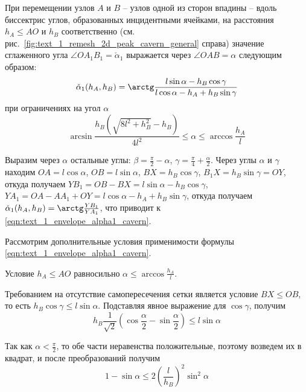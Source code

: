 \documentclass[
11pt,%
tightenlines,%
twoside,%
onecolumn,%
nofloats,%
nobibnotes,%
nofootinbib,%
superscriptaddress,%
noshowpacs,%
centertags]%
{revtex4}
\begin{document}
\begin{lemma}\label{lem:text_1_cavern_smooth}
При перемещении узлов $A$ и $B$ -- узлов одной из сторон впадины -- вдоль биссектрис углов, образованных инцидентными ячейками, на расстояния $h_A \le AO$ и $h_B$ соответственно (см. рис.~\ref{fig:text_1_remesh_2d_peak_cavern_general} справа) значение сглаженного угла $\angle OA_1B_1 = \check{\alpha}_1$ выражается через $\angle OAB = \alpha$ следующим образом:
\begin{equation}\label{eqn:text_1_envelope_alpha1_cavern}
\check{\alpha}_1(h_A, h_B) = \arctg \frac{l \sin \alpha - h_B \cos \gamma}{l \cos \alpha - h_A + h_B \sin \gamma}
\end{equation}
при ограничениях на угол $\alpha$
\begin{equation}\label{eqn:text_1_envelope_alpha1_cavern2}
\arcsin \frac{h_B \left( \sqrt{8 l^2 + h_B^2} - h_B \right)}{4 l^2} \le \alpha \le \arccos \frac{h_A}{l}
\end{equation}
\end{lemma}

Выразим через $\alpha$ остальные углы: $\beta = \frac{\pi}{2} - \alpha$, $\gamma = \frac{\pi}{4} + \frac{\alpha}{2}$.
Через углы $\alpha$ и $\gamma$ находим $OA = l \cos \alpha$, $OB = l \sin \alpha$, $BX = h_B \cos \gamma$, $B_1X = h_B \sin \gamma = OY$, откуда получаем $YB_1 = OB - BX = l \sin \alpha - h_B \cos \gamma$, $YA_1 = OA - AA_1 + OY = l \cos \alpha - h_A + h_B \sin \gamma$, откуда получаем $\check{\alpha}_1(h_A, h_B) = \arctg \frac{YB_1}{YA_1}$, что приводит к \eqref{eqn:text_1_envelope_alpha1_cavern}.

Рассмотрим дополнительные условия применимости формулы \eqref{eqn:text_1_envelope_alpha1_cavern}.

Условие $h_A \le AO$ равносильно $\alpha \le \arccos \frac{h_A}{l}$.

Требованием на отсутствие самопересечения сетки является условие $BX \le OB$, то есть $h_B \cos \gamma \le l \sin \alpha$.
Подставляя явное выражение для $\cos \gamma$, получим
\begin{equation}
	h_B \frac{1}{\sqrt{2}} \left( \cos \frac{\alpha}{2} - \sin \frac{\alpha}{2} \right) \le l \sin \alpha
\end{equation}

Так как $\alpha < \frac{\pi}{2}$, то обе части неравенства положительные, поэтому возведем их в квадрат, и после преобразований получим
\begin{equation}\label{eqn:text_1_envelope_find_alpha3}
	1 - \sin \alpha \le 2 \left( \frac{l}{h_B} \right)^2 \sin^2 \alpha
\end{equation}
\end{document}
